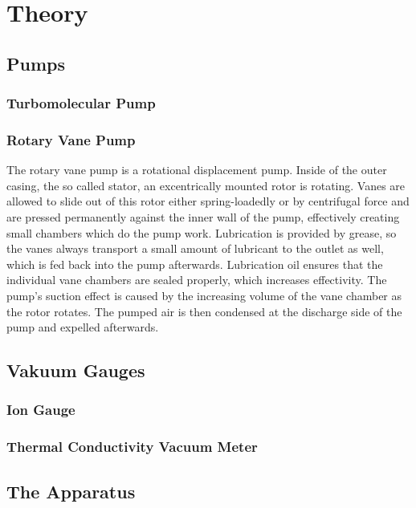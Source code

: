 \chapter{Theory}

\section{Pumps}
\subsection{Turbomolecular Pump}

\subsection{Rotary Vane Pump}
The rotary vane pump is a rotational displacement pump.
Inside of the outer casing, the so called stator, an excentrically mounted rotor is rotating.
Vanes are allowed to slide out of this rotor either spring-loadedly or by centrifugal force and are pressed permanently against the inner wall of the pump, effectively creating small chambers which do the pump work.
Lubrication is provided by grease, so the vanes always transport a small amount of lubricant to the outlet as well, which is fed back into the pump afterwards.
Lubrication oil ensures that the individual vane chambers are sealed properly, which increases effectivity.
The pump's suction effect is caused by the increasing volume of the vane chamber as the rotor rotates.
The pumped air is then condensed at the discharge side of the pump and expelled afterwards.
\section{Vakuum Gauges}
\subsection{Ion Gauge}

\subsection{Thermal Conductivity Vacuum Meter}

\section{The Apparatus}

